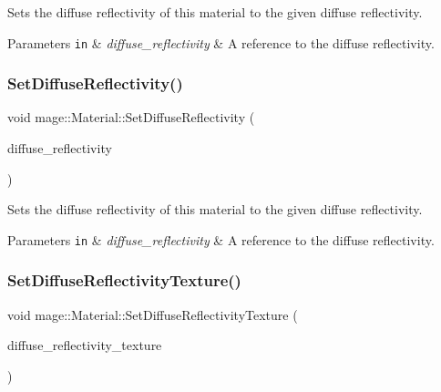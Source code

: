 Sets the diffuse reflectivity of this material to the given diffuse reflectivity.


\begin{DoxyParams}[1]{Parameters}
\mbox{\tt in}  & {\em diffuse\+\_\+reflectivity} & A reference to the diffuse reflectivity. \\
\hline
\end{DoxyParams}
\hypertarget{structmage_1_1_material_a83281d9408fcdc3c6de6804f31a527b3}{}\label{structmage_1_1_material_a83281d9408fcdc3c6de6804f31a527b3} 
\subsubsection{\texorpdfstring{Set\+Diffuse\+Reflectivity()}{SetDiffuseReflectivity()}\hspace{0.1cm}{\footnotesize\ttfamily [2/2]}}
{\footnotesize\ttfamily void mage\+::\+Material\+::\+Set\+Diffuse\+Reflectivity (\begin{DoxyParamCaption}\item[{\hyperlink{structmage_1_1_r_g_b_spectrum}{R\+G\+B\+Spectrum} \&\&}]{diffuse\+\_\+reflectivity }\end{DoxyParamCaption})\hspace{0.3cm}{\ttfamily [noexcept]}}

Sets the diffuse reflectivity of this material to the given diffuse reflectivity.


\begin{DoxyParams}[1]{Parameters}
\mbox{\tt in}  & {\em diffuse\+\_\+reflectivity} & A reference to the diffuse reflectivity. \\
\hline
\end{DoxyParams}
\hypertarget{structmage_1_1_material_a32e02c92dfd73db1a8a809a45546dc87}{}\label{structmage_1_1_material_a32e02c92dfd73db1a8a809a45546dc87} 
\subsubsection{\texorpdfstring{Set\+Diffuse\+Reflectivity\+Texture()}{SetDiffuseReflectivityTexture()}}
{\footnotesize\ttfamily void mage\+::\+Material\+::\+Set\+Diffuse\+Reflectivity\+Texture (\begin{DoxyParamCaption}\item[{\hyperlink{namespacemage_a1e01ae66713838a7a67d30e44c67703e}{Shared\+Ptr}$<$ \hyperlink{classmage_1_1_texture}{Texture} $>$}]{diffuse\+\_\+reflectivity\+\_\+texture }\end{DoxyParamCaption})}

